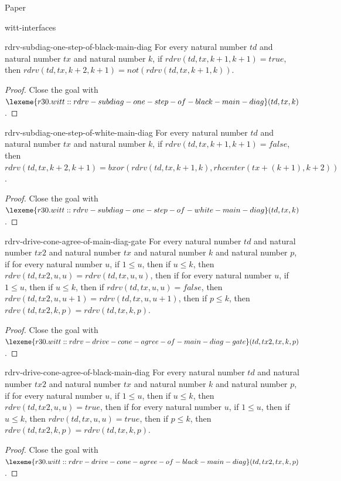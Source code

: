 \begin{lexlean}{Paper}
\begin{section}{witt-interfaces}
  \begin{theorem}{rdrv-subdiag-one-step-of-black-main-diag}
  For every natural number \(td\) and natural number \(tx\) and natural number \(k\), if \(rdrv(td, tx, k + 1, k + 1) = true\), then \(rdrv(td, tx, k + 2, k + 1) = not(rdrv(td, tx, k + 1, k))\).
  \begin{proof}
  Close the goal with \(\lexeme{r30.witt::rdrv-subdiag-one-step-of-black-main-diag}(td, tx, k)\).
  \end{proof}
  \end{theorem}

  \begin{theorem}{rdrv-subdiag-one-step-of-white-main-diag}
  For every natural number \(td\) and natural number \(tx\) and natural number \(k\), if \(rdrv(td, tx, k + 1, k + 1) = false\), then \(rdrv(td, tx, k + 2, k + 1) = bxor(rdrv(td, tx, k + 1, k), rhcenter(tx + (k + 1), k + 2))\).
  \begin{proof}
  Close the goal with \(\lexeme{r30.witt::rdrv-subdiag-one-step-of-white-main-diag}(td, tx, k)\).
  \end{proof}
  \end{theorem}

  \begin{theorem}{rdrv-drive-cone-agree-of-main-diag-gate}
  For every natural number \(td\) and natural number \(tx2\) and natural number \(tx\) and natural number \(k\) and natural number \(p\), if for every natural number \(u\), if \(1 ≤ u\), then if \(u ≤ k\), then \(rdrv(td, tx2, u, u) = rdrv(td, tx, u, u)\), then if for every natural number \(u\), if \(1 ≤ u\), then if \(u ≤ k\), then if \(rdrv(td, tx, u, u) = false\), then \(rdrv(td, tx2, u, u + 1) = rdrv(td, tx, u, u + 1)\), then if \(p ≤ k\), then \(rdrv(td, tx2, k, p) = rdrv(td, tx, k, p)\).
  \begin{proof}
  Close the goal with \(\lexeme{r30.witt::rdrv-drive-cone-agree-of-main-diag-gate}(td, tx2, tx, k, p)\).
  \end{proof}
  \end{theorem}

  \begin{theorem}{rdrv-drive-cone-agree-of-black-main-diag}
  For every natural number \(td\) and natural number \(tx2\) and natural number \(tx\) and natural number \(k\) and natural number \(p\), if for every natural number \(u\), if \(1 ≤ u\), then if \(u ≤ k\), then \(rdrv(td, tx2, u, u) = true\), then if for every natural number \(u\), if \(1 ≤ u\), then if \(u ≤ k\), then \(rdrv(td, tx, u, u) = true\), then if \(p ≤ k\), then \(rdrv(td, tx2, k, p) = rdrv(td, tx, k, p)\).
  \begin{proof}
  Close the goal with \(\lexeme{r30.witt::rdrv-drive-cone-agree-of-black-main-diag}(td, tx2, tx, k, p)\).
  \end{proof}
  \end{theorem}


\end{section}
\end{lexlean}

